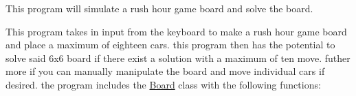 This program will simulate a rush hour game board and solve the board.

This program takes in input from the keyboard to make a rush hour game board and place a maximum of eighteen cars. this program then has the potential to solve said 6x6 board if there exist a solution with a maximum of ten move. futher more if you can manually manipulate the board and move individual cars if desired. the program includes the \hyperlink{class_board}{Board} class with the following functions\+: 
